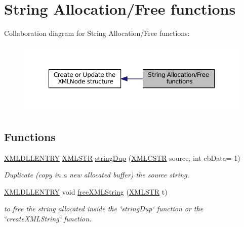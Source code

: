 \hypertarget{group__StringAlloc}{\section{String Allocation/\-Free functions}
\label{group__StringAlloc}
}
Collaboration diagram for String Allocation/\-Free functions\-:
\nopagebreak
\begin{figure}[H]
\begin{center}
\leavevmode
\includegraphics[width=350pt]{group__StringAlloc}
\end{center}
\end{figure}
\subsection*{Functions}
\begin{DoxyCompactItemize}
\item 
\hyperlink{xmlParser_8h_a990c86ec1cdbf675604a1a321d852063}{X\-M\-L\-D\-L\-L\-E\-N\-T\-R\-Y} \hyperlink{xmlParser_8h_a849d96105aa0c8f64b5c10d9151a3cdc}{X\-M\-L\-S\-T\-R} \hyperlink{group__StringAlloc_gac35b3be05a320f835b3976179637fe76}{string\-Dup} (\hyperlink{xmlParser_8h_acdb0d6fd8dd596384b438d86cfb2b182}{X\-M\-L\-C\-S\-T\-R} source, int cb\-Data=-\/1)
\begin{DoxyCompactList}\small\item\em Duplicate (copy in a new allocated buffer) the source string. \end{DoxyCompactList}\item 
\hyperlink{xmlParser_8h_a990c86ec1cdbf675604a1a321d852063}{X\-M\-L\-D\-L\-L\-E\-N\-T\-R\-Y} void \hyperlink{group__StringAlloc_ga6a510c9553d7fa49d0afdda1d7928669}{free\-X\-M\-L\-String} (\hyperlink{xmlParser_8h_a849d96105aa0c8f64b5c10d9151a3cdc}{X\-M\-L\-S\-T\-R} t)
\begin{DoxyCompactList}\small\item\em to free the string allocated inside the \char`\"{}string\-Dup\char`\"{} function or the \char`\"{}create\-X\-M\-L\-String\char`\"{} function. \end{DoxyCompactList}\end{DoxyCompactItemize}


